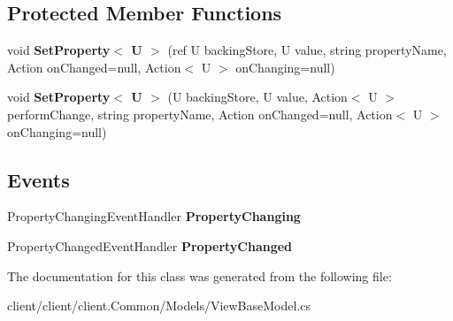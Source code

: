 \subsection*{Protected Member Functions}
\begin{DoxyCompactItemize}
\item 
\hypertarget{classClient_1_1Common_1_1Models_1_1ViewBaseModel_a3bc77c2290403df5a831d489e8e21b85}{void {\bfseries Set\-Property$<$ U $>$} (ref U backing\-Store, U value, string property\-Name, Action on\-Changed=null, Action$<$ U $>$ on\-Changing=null)}\label{classClient_1_1Common_1_1Models_1_1ViewBaseModel_a3bc77c2290403df5a831d489e8e21b85}

\item 
\hypertarget{classClient_1_1Common_1_1Models_1_1ViewBaseModel_a433581bc6700c98268c6d5369ec3fbd4}{void {\bfseries Set\-Property$<$ U $>$} (U backing\-Store, U value, Action$<$ U $>$ perform\-Change, string property\-Name, Action on\-Changed=null, Action$<$ U $>$ on\-Changing=null)}\label{classClient_1_1Common_1_1Models_1_1ViewBaseModel_a433581bc6700c98268c6d5369ec3fbd4}

\end{DoxyCompactItemize}
\subsection*{Events}
\begin{DoxyCompactItemize}
\item 
\hypertarget{classClient_1_1Common_1_1Models_1_1ViewBaseModel_a891cf84357c775a6924876525bcd0421}{Property\-Changing\-Event\-Handler {\bfseries Property\-Changing}}\label{classClient_1_1Common_1_1Models_1_1ViewBaseModel_a891cf84357c775a6924876525bcd0421}

\item 
\hypertarget{classClient_1_1Common_1_1Models_1_1ViewBaseModel_a131179a8fb913c864263e8ce41ac2f6a}{Property\-Changed\-Event\-Handler {\bfseries Property\-Changed}}\label{classClient_1_1Common_1_1Models_1_1ViewBaseModel_a131179a8fb913c864263e8ce41ac2f6a}

\end{DoxyCompactItemize}


The documentation for this class was generated from the following file\-:\begin{DoxyCompactItemize}
\item 
client/client/client.\-Common/\-Models/View\-Base\-Model.\-cs\end{DoxyCompactItemize}
